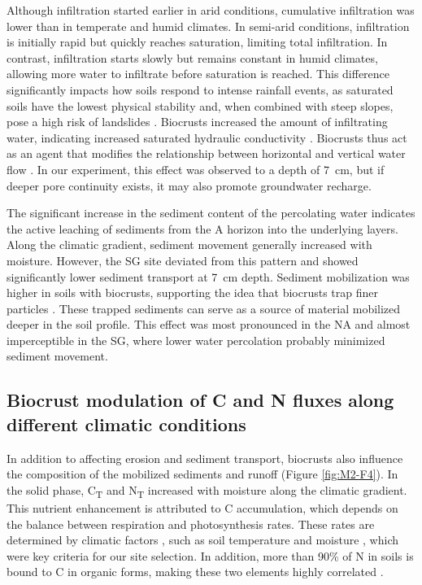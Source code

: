 Although infiltration started earlier in arid conditions, cumulative infiltration was lower than in temperate and humid climates. In semi-arid conditions, infiltration is initially rapid but quickly reaches saturation, limiting total infiltration. In contrast, infiltration starts slowly but remains constant in humid climates, allowing more water to infiltrate before saturation is reached. This difference significantly impacts how soils respond to intense rainfall events, as saturated soils have the lowest physical stability \citep{Montrasio2018} and, when combined with steep slopes, pose a high risk of landslides \citep{Godt2009}.
Biocrusts increased the amount of infiltrating water, indicating increased saturated hydraulic conductivity \citep{Bauer1974}. Biocrusts thus act as an agent that modifies the relationship between horizontal and vertical water flow \citep{Li2022}. In our experiment, this effect was observed to a depth of \SI{7}{\centi\meter}, but if deeper pore continuity exists, it may also promote groundwater recharge.

The significant increase in the sediment content of the percolating water indicates the active leaching of sediments from the A horizon into the underlying layers. Along the climatic gradient, sediment movement generally increased with moisture. However, the SG site deviated from this pattern and showed significantly lower sediment transport at \SI{7}{\centi\meter} depth. Sediment mobilization was higher in soils with biocrusts, supporting the idea that biocrusts trap finer particles \citep{Chen2008,GarciaPichel2016}. These trapped sediments can serve as a source of material mobilized deeper in the soil profile. This effect was most pronounced in the NA and almost imperceptible in the SG, where lower water percolation probably minimized sediment movement.

\subsection{Biocrust modulation of C and N fluxes along different climatic conditions}

In addition to affecting erosion and sediment transport, biocrusts also influence the composition of the mobilized sediments and runoff (Figure \ref{fig:M2-F4}). In the solid phase, C\textsubscript{T} and N\textsubscript{T} increased with moisture along the climatic gradient. This nutrient enhancement is attributed to C accumulation, which depends on the balance between respiration and photosynthesis rates. These rates are determined by climatic factors \citep{Wang2022}, such as soil temperature and moisture \citep{Ontl2012}, which were key criteria for our site selection. In addition, more than 90\% of N in soils is bound to C in organic forms, making these two elements highly correlated \citep{Li2014}.

